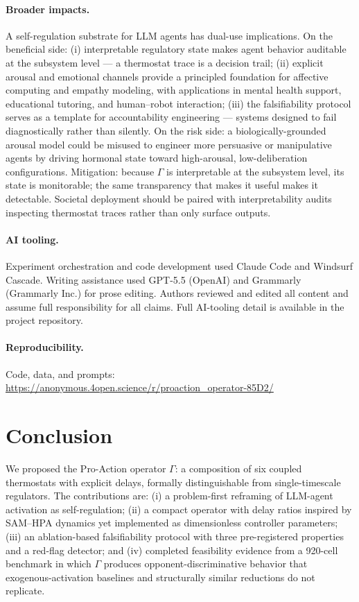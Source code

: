 \documentclass{article}
\begin{document}
\paragraph{Broader impacts.} A self-regulation substrate for LLM agents has dual-use implications. On the beneficial side: (i) interpretable regulatory state makes agent behavior auditable at the subsystem level --- a thermostat trace is a decision trail; (ii) explicit arousal and emotional channels provide a principled foundation for affective computing and empathy modeling, with applications in mental health support, educational tutoring, and human--robot interaction; (iii) the falsifiability protocol serves as a template for accountability engineering --- systems designed to fail diagnostically rather than silently. On the risk side: a biologically-grounded arousal model could be misused to engineer more persuasive or manipulative agents by driving hormonal state toward high-arousal, low-deliberation configurations. Mitigation: because $\Gamma$ is interpretable at the subsystem level, its state is monitorable; the same transparency that makes it useful makes it detectable. Societal deployment should be paired with interpretability audits inspecting thermostat traces rather than only surface outputs.

\paragraph{AI tooling.} Experiment orchestration and code development used Claude Code and Windsurf Cascade. Writing assistance used GPT-5.5 (OpenAI) and Grammarly (Grammarly Inc.) for prose editing. Authors reviewed and edited all content and assume full responsibility for all claims. Full AI-tooling detail is available in the project repository.

\paragraph{Reproducibility.} Code, data, and prompts: \url{https://anonymous.4open.science/r/proaction_operator-85D2/}

\section{Conclusion}

We proposed the Pro-Action operator $\Gamma$: a composition of six coupled thermostats with explicit delays, formally distinguishable from single-timescale regulators. The contributions are: (i) a problem-first reframing of LLM-agent activation as self-regulation; (ii) a compact operator with delay ratios inspired by SAM--HPA dynamics yet implemented as dimensionless controller parameters; (iii) an ablation-based falsifiability protocol with three pre-registered properties and a red-flag detector; and (iv) completed feasibility evidence from a 920-cell benchmark in which $\Gamma$ produces opponent-discriminative behavior that exogenous-activation baselines and structurally similar reductions do not replicate.
\end{document}

